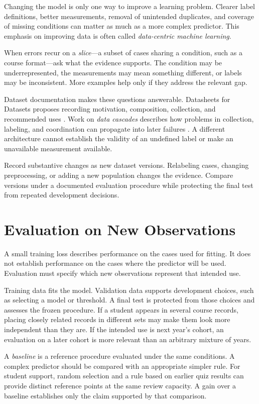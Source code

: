 Changing the model is only one way to improve a learning problem. Clearer label definitions, better measurements, removal of unintended duplicates, and coverage of missing conditions can matter as much as a more complex predictor. This emphasis on improving data is often called \emph{data-centric machine learning}.

When errors recur on a \emph{slice}---a subset of cases sharing a condition, such as a course format---ask what the evidence supports. The condition may be underrepresented, the measurements may mean something different, or labels may be inconsistent. More examples help only if they address the relevant gap.

Dataset documentation makes these questions answerable. Datasheets for Datasets proposes recording motivation, composition, collection, and recommended uses \citep{gebru2018datasheets}. Work on \emph{data cascades} describes how problems in collection, labeling, and coordination can propagate into later failures \citep{sambasivan2021}. A different architecture cannot establish the validity of an undefined label or make an unavailable measurement available.

Record substantive changes as new dataset versions. Relabeling cases, changing preprocessing, or adding a new population changes the evidence. Compare versions under a documented evaluation procedure while protecting the final test from repeated development decisions.

\section{Evaluation on New Observations}

A small training loss describes performance on the cases used for fitting. It does not establish performance on the cases where the predictor will be used. Evaluation must specify which new observations represent that intended use.

Training data fits the model. Validation data supports development choices, such as selecting a model or threshold. A final test is protected from those choices and assesses the frozen procedure. If a student appears in several course records, placing closely related records in different sets may make them look more independent than they are. If the intended use is next year's cohort, an evaluation on a later cohort is more relevant than an arbitrary mixture of years.

A \emph{baseline} is a reference procedure evaluated under the same conditions. A complex predictor should be compared with an appropriate simpler rule. For student support, random selection and a rule based on earlier quiz results can provide distinct reference points at the same review capacity. A gain over a baseline establishes only the claim supported by that comparison.


